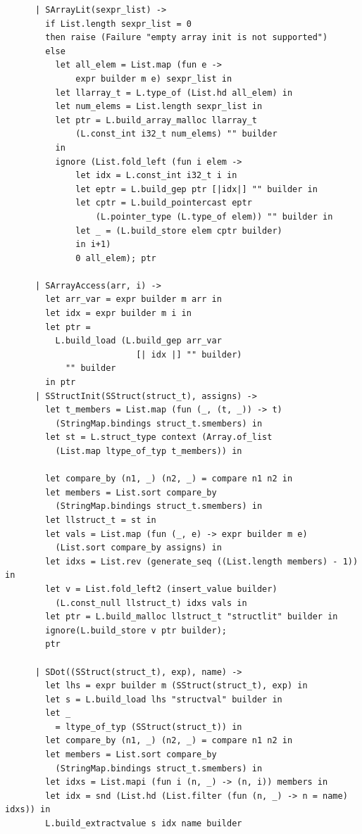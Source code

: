 \documentclass[12pt]{article}
\begin{document}
\begin{mdframed}[hidealllines=true,backgroundcolor=blue!20]
\begin{lstlisting}
      | SArrayLit(sexpr_list) -> 
        if List.length sexpr_list = 0
        then raise (Failure "empty array init is not supported")
        else
          let all_elem = List.map (fun e ->
              expr builder m e) sexpr_list in
          let llarray_t = L.type_of (List.hd all_elem) in
          let num_elems = List.length sexpr_list in
          let ptr = L.build_array_malloc llarray_t
              (L.const_int i32_t num_elems) "" builder 
          in
          ignore (List.fold_left (fun i elem ->
              let idx = L.const_int i32_t i in
              let eptr = L.build_gep ptr [|idx|] "" builder in
              let cptr = L.build_pointercast eptr 
                  (L.pointer_type (L.type_of elem)) "" builder in
              let _ = (L.build_store elem cptr builder) 
              in i+1)
              0 all_elem); ptr

      | SArrayAccess(arr, i) ->
        let arr_var = expr builder m arr in
        let idx = expr builder m i in 
        let ptr = 
          L.build_load (L.build_gep arr_var 
                          [| idx |] "" builder) 
            "" builder 
        in ptr
      | SStructInit(SStruct(struct_t), assigns) ->
        let t_members = List.map (fun (_, (t, _)) -> t) 
          (StringMap.bindings struct_t.smembers) in
        let st = L.struct_type context (Array.of_list 
          (List.map ltype_of_typ t_members)) in

        let compare_by (n1, _) (n2, _) = compare n1 n2 in
        let members = List.sort compare_by 
          (StringMap.bindings struct_t.smembers) in
        let llstruct_t = st in
        let vals = List.map (fun (_, e) -> expr builder m e) 
          (List.sort compare_by assigns) in
        let idxs = List.rev (generate_seq ((List.length members) - 1)) in
        let v = List.fold_left2 (insert_value builder) 
          (L.const_null llstruct_t) idxs vals in
        let ptr = L.build_malloc llstruct_t "structlit" builder in
        ignore(L.build_store v ptr builder);
        ptr

      | SDot((SStruct(struct_t), exp), name) ->
        let lhs = expr builder m (SStruct(struct_t), exp) in
        let s = L.build_load lhs "structval" builder in
        let _
          = ltype_of_typ (SStruct(struct_t)) in
        let compare_by (n1, _) (n2, _) = compare n1 n2 in
        let members = List.sort compare_by 
          (StringMap.bindings struct_t.smembers) in
        let idxs = List.mapi (fun i (n, _) -> (n, i)) members in
        let idx = snd (List.hd (List.filter (fun (n, _) -> n = name) idxs)) in
        L.build_extractvalue s idx name builder
      

\end{lstlisting}
\end{mdframed}
\end{document}
